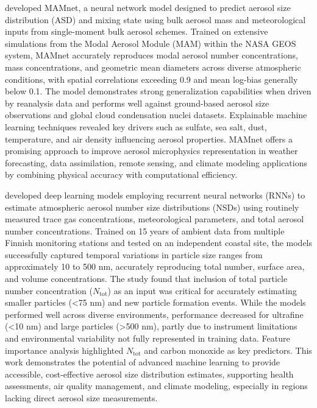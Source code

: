 \documentclass[11pt]{article}
\begin{document}
\citet{barahona2025deep} developed MAMnet, a neural network model designed to predict aerosol size distribution (ASD) and mixing state using bulk aerosol mass and meteorological inputs from single-moment bulk aerosol schemes. Trained on extensive simulations from the Modal Aerosol Module (MAM) within the NASA GEOS system, MAMnet accurately reproduces modal aerosol number concentrations, mass concentrations, and geometric mean diameters across diverse atmospheric conditions, with spatial correlations exceeding 0.9 and mean log-bias generally below 0.1. The model demonstrates strong generalization capabilities when driven by reanalysis data and performs well against ground-based aerosol size observations and global cloud condensation nuclei datasets. Explainable machine learning techniques revealed key drivers such as sulfate, sea salt, dust, temperature, and air density influencing aerosol properties. MAMnet offers a promising approach to improve aerosol microphysics representation in weather forecasting, data assimilation, remote sensing, and climate modeling applications by combining physical accuracy with computational efficiency.

\citet{wu2025estimating} developed deep learning models employing recurrent neural networks (RNNs) to estimate atmospheric aerosol number size distributions (NSDs) using routinely measured trace gas concentrations, meteorological parameters, and total aerosol number concentrations. Trained on 15 years of ambient data from multiple Finnish monitoring stations and tested on an independent coastal site, the models successfully captured temporal variations in particle size ranges from approximately 10 to 500 nm, accurately reproducing total number, surface area, and volume concentrations. The study found that inclusion of total particle number concentration (\(N_{\text{tot}}\)) as an input was critical for accurately estimating smaller particles (<75 nm) and new particle formation events. While the models performed well across diverse environments, performance decreased for ultrafine (<10 nm) and large particles (>500 nm), partly due to instrument limitations and environmental variability not fully represented in training data. Feature importance analysis highlighted \(N_{\text{tot}}\) and carbon monoxide as key predictors. This work demonstrates the potential of advanced machine learning to provide accessible, cost-effective aerosol size distribution estimates, supporting health assessments, air quality management, and climate modeling, especially in regions lacking direct aerosol size measurements.
\end{document}
